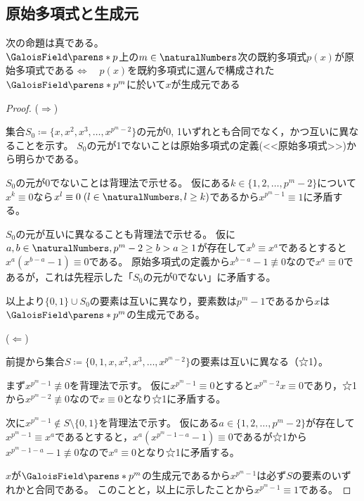         \subsection{原始多項式と生成元}
            \begin{shadebox}
                次の命題は真である。\\
                $\GaloisField\parens*{p}$上の$m\in\naturalNumbers$次の既約多項式$p(x)$が原始多項式である$\iff\quad p(x)$を既約多項式に選んで構成された$\GaloisField\parens*{p^m}$に於いて$x$が生成元である
            \end{shadebox}
            \begin{proof}
                ($\Rightarrow$)
                \par
                集合$S_0\coloneq\{x,x^2,x^3,\dots,x^{p^m-2}\}$の元が0, 1いずれとも合同でなく，かつ互いに異なることを示す。
                $S_0$の元が1でないことは原始多項式の定義(<<原始多項式>>)から明らかである。
                \par
                $S_0$の元が0でないことは背理法で示せる。
                仮にある$k\in\{1,2,\dots,p^m-2\}$について$x^k\equiv 0$なら$x^l\equiv 0\;(l\in\naturalNumbers,l\geq k)$であるから$x^{p^m-1}\equiv 1$に矛盾する。
                \par
                $S_0$の元が互いに異なることも背理法で示せる。
                仮に$a,b\in\naturalNumbers,p^m-2\geq b>a\geq1$が存在して$x^b\equiv x^a$であるとすると$x^a(x^{b-a}-1)\equiv 0$である。
                原始多項式の定義から$x^{b-a}-1\not\equiv 0$なので$x^a\equiv 0$であるが，これは先程示した「$S_0$の元が0でない」に矛盾する。
                \par
                以上より$\{0,1\}\cup S_0$の要素は互いに異なり，要素数は$p^m-1$であるから$x$は$\GaloisField\parens*{p^m}$の生成元である。
                \par\noindent
                ($\Leftarrow$)
                \par
                前提から集合$S\coloneq\{0,1,x,x^2,x^3,\dots,x^{p^m-2}\}$の要素は互いに異なる（☆1）。
                \par
                まず$x^{p^m-1}\not\equiv 0$を背理法で示す。
                仮に$x^{p^m-1}\equiv 0$とすると$x^{p^m-2}x\equiv 0$であり，☆1から$x^{p^m-2}\not\equiv 0$なので$x\equiv 0$となり☆1に矛盾する。
                \par
                次に$x^{p^m-1}\not\in S\setminus\{0,1\}$を背理法で示す。
                仮にある$a\in\{1,2,\dots,p^m-2\}$が存在して$x^{p^m-1}\equiv x^a$であるとすると，$x^a(x^{p^m-1-a}-1)\equiv 0$であるが☆1から$x^{p^m-1-a}-1\not\equiv 0$なので$x^a\equiv 0$となり☆1に矛盾する。
                \par
                $x$が$\GaloisField\parens*{p^m}$の生成元であるから$x^{p^m-1}$は必ず$S$の要素のいずれかと合同である。
                このことと，以上に示したことから$x^{p^m-1}\equiv 1$である。
            \end{proof}
